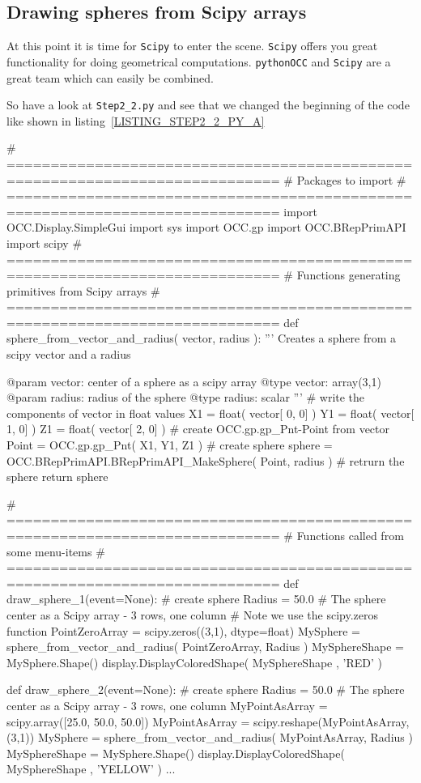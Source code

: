 \subsection{Drawing spheres from Scipy arrays}
At this point it is time for {\tt Scipy} to enter the scene.
{\tt Scipy} offers you great functionality for doing geometrical computations.
{\tt pythonOCC} and {\tt Scipy} are a great team which can easily be combined.

So have a look at {\tt Step2\_2.py} and see that we changed the beginning of the code like shown in listing~\ref{LISTING_STEP2_2_PY_A}
\begin{python}[moreemph={[4], 46, 48},caption={Step2\_1.py - Involve Scipy},label=LISTING_STEP2_2_PY_A]
# =============================================================================
# Packages to import
# =============================================================================
import OCC.Display.SimpleGui 
import sys
import OCC.gp 
import OCC.BRepPrimAPI 
import scipy
# =============================================================================
# Functions generating primitives from Scipy arrays
# =============================================================================
def sphere_from_vector_and_radius(  vector, 
                                    radius ):
    '''
    Creates a sphere from a scipy vector and a radius

    @param vector: center of a sphere as a scipy array
    @type  vector: array(3,1)
    @param radius: radius of the sphere
    @type  radius: scalar
    '''
    # write the components of vector in float values
    X1 = float( vector[ 0, 0] )
    Y1 = float( vector[ 1, 0] )
    Z1 = float( vector[ 2, 0] )
    # create OCC.gp.gp_Pnt-Point from vector
    Point = OCC.gp.gp_Pnt( X1, Y1, Z1 )
    # create sphere
    sphere = OCC.BRepPrimAPI.BRepPrimAPI_MakeSphere( Point, radius )
    # retrurn the sphere
    return sphere 

# =============================================================================
# Functions called from some menu-items
# =============================================================================
def draw_sphere_1(event=None):
    # create sphere
    Radius = 50.0
    # The sphere center as a Scipy array - 3 rows, one column
    # Note we use the scipy.zeros function
    PointZeroArray = scipy.zeros((3,1), dtype=float)
    MySphere = sphere_from_vector_and_radius(   PointZeroArray, 
                                                Radius )
    MySphereShape = MySphere.Shape()
    display.DisplayColoredShape( MySphereShape , 'RED' ) 

def draw_sphere_2(event=None):
    # create sphere
    Radius = 50.0
    # The sphere center as a Scipy array - 3 rows, one column
    MyPointAsArray = scipy.array([25.0, 50.0, 50.0])
    MyPointAsArray = scipy.reshape(MyPointAsArray,(3,1))
    MySphere = sphere_from_vector_and_radius(   MyPointAsArray, 
                                                Radius )
    MySphereShape = MySphere.Shape()
    display.DisplayColoredShape( MySphereShape , 'YELLOW' ) 
...    
\end{python}
